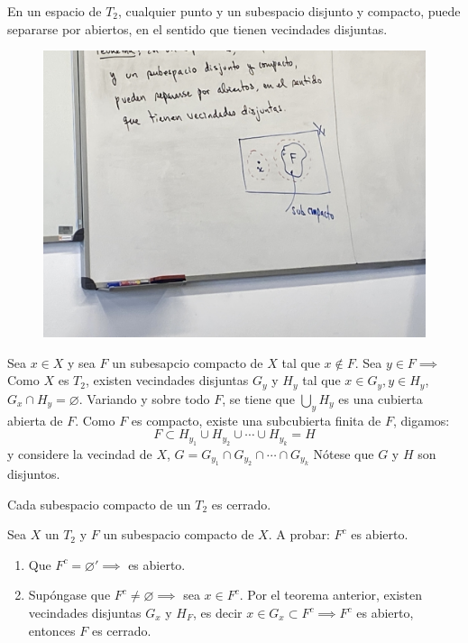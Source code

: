\begin{teorema}
    En un espacio de $T_2$, cualquier punto y un subespacio disjunto y compacto, puede separarse por abiertos, en el sentido que tienen vecindades disjuntas. 
    \begin{figure}[H]
        \centering
        \includegraphics[scale=0.1]{imagenes/ejemplo3.jpeg}
    \end{figure}
    \begin{dem}
        Sea $x\in X$ y sea $F$ un subesapcio compacto de $X$ tal que $x\not\in F$. Sea $y\in F\implies$ Como $X$ es $T_2$, existen vecindades disjuntas $G_y$ y $H_y$ tal que $x\in G_y, y\in H_y$, $G_x\cap H_y=\varnothing$. Variando y sobre todo $F$, se tiene que $\bigcup_y H_y$ es una cubierta abierta de $F$. Como $F$ es compacto, existe una subcubierta finita de $F$, digamos: 
        $$F\subset H_{y_1}\cup H_{y_2}\cup\cdots \cup H_{y_k}=H$$
        y considere la vecindad de $X$, $G=G_{y_1}\cap G_{y_2}\cap\cdots \cap G_{y_k}$
        Nótese que $G$ y $H$ son disjuntos. 
    \end{dem}
\end{teorema}

\begin{teorema}
    Cada subespacio compacto de un $T_2$ es cerrado. 
    \begin{dem}
        Sea $X$ un $T_2$ y $F$ un subespacio compacto de $X$. A probar: $F^c$ es abierto. 
        \begin{enumerate}
            \item Que $F^c=\varnothing'\implies $ es abierto. 
            \item Supóngase que $F^c\neq \varnothing\implies$ sea $x\in F^c$. Por el teorema anterior, existen vecindades disjuntas $G_x$ y $H_F$, es decir $x\in G_x\subset F^c\implies F^c$ es abierto, entonces $F$ es cerrado.   
        \end{enumerate}
    \end{dem}
\end{teorema}

